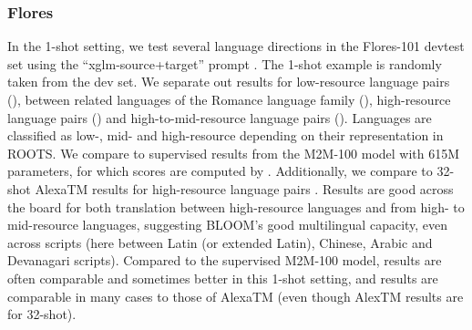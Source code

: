 \documentclass[twoside,11pt]{article}
\begin{document}


\subsubsection{Flores}

%


In the 1-shot setting, we test several language directions in the Flores-101 \citep{goyal-etal-2022-flores} devtest set using the ``xglm-source+target'' prompt \citep{lin2021xglm}. %
The 1-shot example is randomly taken from the dev set.
We separate out results for low-resource language pairs (), between related languages of the Romance language family (), high-resource language pairs () and high-to-mid-resource language pairs (). %
Languages are classified as low-, mid- and high-resource depending on their representation in ROOTS.
We compare to supervised results from the M2M-100 model \citep{fan-etal-2021-beyond} with 615M parameters, for which scores are computed by \cite{goyal-etal-2022-flores}. Additionally, we compare to %
32-shot AlexaTM results for high-resource language pairs \citep{soltan-etal-2022-alexatm}. %
%
Results are good across the board for both translation between high-resource languages and from high- to mid-resource languages, suggesting BLOOM's good multilingual capacity, even across scripts (here between Latin (or extended Latin), Chinese, Arabic and Devanagari scripts). Compared to the supervised M2M-100 model, results are often comparable and sometimes better in this 1-shot setting, and results are comparable in many cases to those of AlexaTM (even though AlexTM results are for 32-shot).
\end{document}
